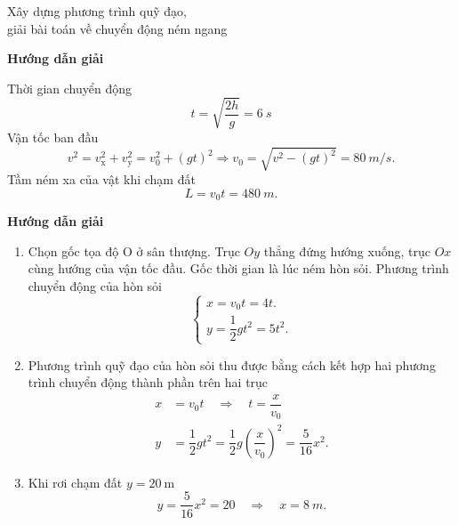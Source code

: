 \begin{dang}{Xây dựng phương trình quỹ đạo, \\giải bài toán về chuyển động ném ngang}
	{	\begin{center}
			\textbf{Hướng dẫn giải}
		\end{center}
		
		Thời gian chuyển động
		\begin{equation*}
			t=\sqrt{\dfrac{2h}{g}} = \SI{6}{s}
		\end{equation*}
		Vận tốc ban đầu 
		\begin{equation*}
			v^2 = v^2_{\text{x}} + v^2_{\text{y}}  = v^2_0+ (gt)^2 \Rightarrow v_0 =\sqrt{ v^2 -(gt)^2} = \SI{80}{m/s}.  
		\end{equation*}
		Tầm ném xa của vật khi chạm đất
		\begin{equation*}
			L=v_0 t  = \SI{480}{m}.
		\end{equation*}
		
	}
	{	\begin{center}
			\textbf{Hướng dẫn giải}
		\end{center}
		\begin{enumerate}[label=\alph*.]
			\item Chọn gốc tọa độ O ở sân thượng. Trục $Oy$ thẳng đứng hướng xuống, trục $Ox$ cùng hướng của vận tốc đầu. Gốc thời gian là lúc ném hòn sỏi. Phương trình chuyển động của hòn sỏi
			\begin{equation*}
				\begin{cases}
					x =v_0t = 4t. \\
					y = \dfrac{1}{2}gt^2 =5t^2.
				\end{cases}
			\end{equation*}
			\item Phương trình quỹ đạo của hòn sỏi thu được bằng cách kết hợp hai phương trình chuyển động thành phần trên hai trục
			\begin{align*}
				x&=v_0t	\quad\Rightarrow\quad t=\dfrac{x}{v_0}\\
				y&=\dfrac{1}{2}gt^{2}=\dfrac{1}{2}g\left(\dfrac{x}{v_0}\right)^{2}= \dfrac{5}{16}x^2.
			\end{align*}
			\item Khi rơi chạm đất $y = \SI{20}{\meter}$
			$$y=\dfrac{5}{16}x^2 =20 \quad\Rightarrow\quad x = \SI{8}{m}.$$
			

\end{enumerate}}
\end{dang}
